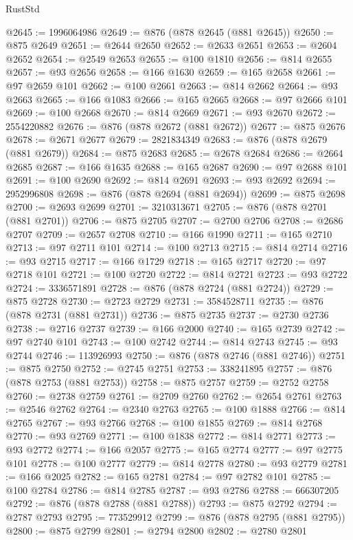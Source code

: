 \begin{lexlean}{RustStd}
\begin{coremodule}
@2645 := 1996064986
@2649 := @876 (@878 @2645 (@881 @2645))
@2650 := @875 @2649
@2651 := @2644 @2650
@2652 := @2633 @2651
@2653 := @2604 @2652
@2654 := @2549 @2653
@2655 := @100 @1810
@2656 := @814 @2655
@2657 := @93 @2656
@2658 := @166 @1630
@2659 := @165 @2658
@2661 := @97 @2659 @101
@2662 := @100 @2661
@2663 := @814 @2662
@2664 := @93 @2663
@2665 := @166 @1083
@2666 := @165 @2665
@2668 := @97 @2666 @101
@2669 := @100 @2668
@2670 := @814 @2669
@2671 := @93 @2670
@2672 := 2554220882
@2676 := @876 (@878 @2672 (@881 @2672))
@2677 := @875 @2676
@2678 := @2671 @2677
@2679 := 2821834349
@2683 := @876 (@878 @2679 (@881 @2679))
@2684 := @875 @2683
@2685 := @2678 @2684
@2686 := @2664 @2685
@2687 := @166 @1635
@2688 := @165 @2687
@2690 := @97 @2688 @101
@2691 := @100 @2690
@2692 := @814 @2691
@2693 := @93 @2692
@2694 := 2952996808
@2698 := @876 (@878 @2694 (@881 @2694))
@2699 := @875 @2698
@2700 := @2693 @2699
@2701 := 3210313671
@2705 := @876 (@878 @2701 (@881 @2701))
@2706 := @875 @2705
@2707 := @2700 @2706
@2708 := @2686 @2707
@2709 := @2657 @2708
@2710 := @166 @1990
@2711 := @165 @2710
@2713 := @97 @2711 @101
@2714 := @100 @2713
@2715 := @814 @2714
@2716 := @93 @2715
@2717 := @166 @1729
@2718 := @165 @2717
@2720 := @97 @2718 @101
@2721 := @100 @2720
@2722 := @814 @2721
@2723 := @93 @2722
@2724 := 3336571891
@2728 := @876 (@878 @2724 (@881 @2724))
@2729 := @875 @2728
@2730 := @2723 @2729
@2731 := 3584528711
@2735 := @876 (@878 @2731 (@881 @2731))
@2736 := @875 @2735
@2737 := @2730 @2736
@2738 := @2716 @2737
@2739 := @166 @2000
@2740 := @165 @2739
@2742 := @97 @2740 @101
@2743 := @100 @2742
@2744 := @814 @2743
@2745 := @93 @2744
@2746 := 113926993
@2750 := @876 (@878 @2746 (@881 @2746))
@2751 := @875 @2750
@2752 := @2745 @2751
@2753 := 338241895
@2757 := @876 (@878 @2753 (@881 @2753))
@2758 := @875 @2757
@2759 := @2752 @2758
@2760 := @2738 @2759
@2761 := @2709 @2760
@2762 := @2654 @2761
@2763 := @2546 @2762
@2764 := @2340 @2763
@2765 := @100 @1888
@2766 := @814 @2765
@2767 := @93 @2766
@2768 := @100 @1855
@2769 := @814 @2768
@2770 := @93 @2769
@2771 := @100 @1838
@2772 := @814 @2771
@2773 := @93 @2772
@2774 := @166 @2057
@2775 := @165 @2774
@2777 := @97 @2775 @101
@2778 := @100 @2777
@2779 := @814 @2778
@2780 := @93 @2779
@2781 := @166 @2025
@2782 := @165 @2781
@2784 := @97 @2782 @101
@2785 := @100 @2784
@2786 := @814 @2785
@2787 := @93 @2786
@2788 := 666307205
@2792 := @876 (@878 @2788 (@881 @2788))
@2793 := @875 @2792
@2794 := @2787 @2793
@2795 := 773529912
@2799 := @876 (@878 @2795 (@881 @2795))
@2800 := @875 @2799
@2801 := @2794 @2800
@2802 := @2780 @2801

\end{coremodule}
\end{lexlean}
